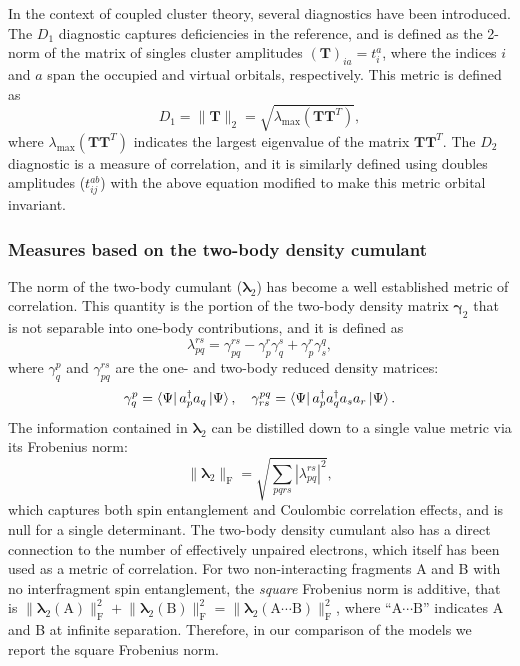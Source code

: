\documentclass[aip,jcp,amsmath,amssymb, preprint]{revtex4-1}
\providecommand{\norm}[1]{\lVert#1\rVert}
\begin{document}
In the context of coupled cluster theory, several diagnostics have been introduced.
The $D_1$ diagnostic captures deficiencies in the reference, and is defined as the 2-norm of the matrix of singles cluster amplitudes $(\mathbf{T})_{ia} = t_i^a$, where the indices $i$ and $a$ span the occupied and virtual orbitals, respectively.
This metric is defined as
\begin{equation}
D_1 = \| \mathbf{T} \|_2 = \sqrt{\lambda_{\max} (\mathbf{TT}^T)},
\end{equation}
where $\lambda_{\max} (\mathbf{TT}^T)$ indicates the largest eigenvalue of the matrix $\mathbf{TT}^T$.
The $D_2$ diagnostic is a measure of correlation, and it is similarly defined using doubles amplitudes ($t_{ij}^{ab}$) with the above equation modified to make this metric orbital invariant.\cite{nielsen1999double}

\subsubsection{Measures based on the two-body density cumulant}

The norm of the two-body cumulant ($\pmb{ \lambda}_{2}$) has become a well established metric of correlation.\cite{Luzanov2005IrreducibleCharge,  Huang2006Entanglement, Juhasz2006TheCumulant, Luzanova2007HighOrder, Alcoba2010OnThe}
This quantity is the portion of the two-body density matrix $\pmb{ \gamma}_{2}$ that is not separable into one-body contributions, and it is defined as
\begin{equation}
\lambda_{pq}^{rs} = \gamma_{pq}^{rs}
- \gamma_{p}^{r} \gamma_{q}^{s}
+ \gamma_{p}^{r} \gamma_{s}^{q},
\end{equation}
where $\gamma^{p}_{q} $ and $\gamma_{pq}^{rs}$ are the one- and two-body reduced density matrices:
\begin{align}
\gamma^{p}_{q} = \bra{\Psi} a_{p}^{\dagger} a_{q} \ket{\Psi}, \quad 
\gamma^{pq}_{rs} = \bra{\Psi} a_{p}^{\dagger} a_{q}^{\dagger} a_{s}  a_{r} \ket{\Psi}.
\end{align}
The information contained in $\pmb{ \lambda}_{2}$ can be distilled down to a single value metric via its Frobenius norm:
\begin{equation}
\norm{\pmb{ \lambda}_{2}}_\mathrm{F} = \sqrt{\sum_{pqrs} |\lambda_{pq}^{rs}|^{2}},
\end{equation}
which captures both spin entanglement and Coulombic correlation effects,\cite{Juhasz2006TheCumulant, Alcoba2010OnThe} and is null for a single determinant.
The two-body density cumulant also has a direct connection to the number of effectively unpaired electrons, which itself has been used as a metric of correlation.\cite{Bochicchio1998OnSpin, Lain2009ADecomposition, Alcoba2006OnTheDefinition}
For two non-interacting fragments A and B with no interfragment spin entanglement, the \textit{square} Frobenius norm is additive,\cite{Juhasz2006TheCumulant,Alcoba2010OnThe} that is $\norm{\pmb{ \lambda}_{2}(\mathrm{A})}^2_\mathrm{F} +\norm{\pmb{ \lambda}_{2}(\mathrm{B})}^2_\mathrm{F} = \norm{\pmb{ \lambda}_{2}(\mathrm{A}\cdots\mathrm{B})}^2_\mathrm{F}$, where ``$\mathrm{A}\cdots\mathrm{B}$'' indicates A and B at infinite separation. Therefore, in our comparison of the models we report the square Frobenius norm.
\end{document}
